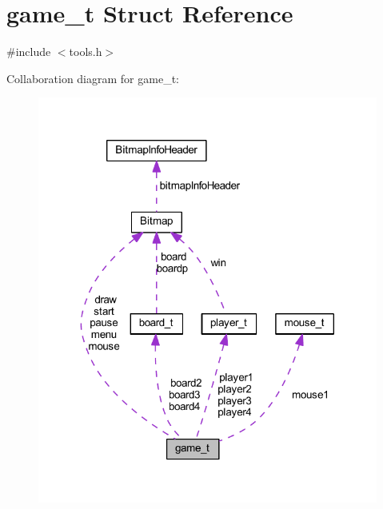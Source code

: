 \hypertarget{structgame__t}{}\section{game\+\_\+t Struct Reference}
\label{structgame__t}


{\ttfamily \#include $<$tools.\+h$>$}



Collaboration diagram for game\+\_\+t\+:
\nopagebreak
\begin{figure}[H]
\begin{center}
\leavevmode
\includegraphics[width=317pt]{structgame__t__coll__graph}
\end{center}
\end{figure}
